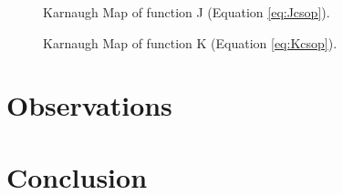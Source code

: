 \documentclass[12pt]{article}
\begin{document}
\begin{figure}[!hbt]
\begin{center}
\end{center}
\caption{Karnaugh Map of function J (Equation \ref{eq:Jcsop}).}
\label{fig:Jmap}
\end{figure}

\begin{figure}[!hbt]
\begin{center}
\end{center}
\caption{Karnaugh Map of function K (Equation \ref{eq:Kcsop}).}
\label{fig:Kmap}
\end{figure}


\section{Observations}

\section{Conclusion}


%
%

\end{document}
